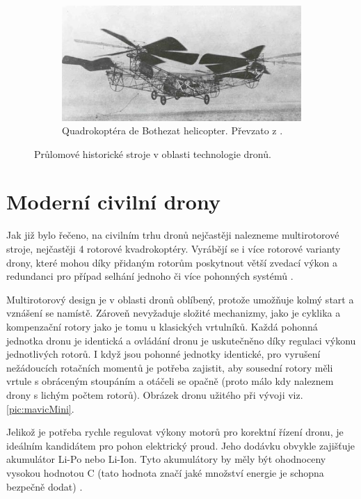 \begin{figure}[ht]
\begin{subfigure}[t]{0.26\linewidth}
        \label{pic:autoPlane}
    \end{subfigure}
        \hfill
    \begin{subfigure}[t]{0.43\linewidth}
        \centering
        \includegraphics[width=\linewidth]{obrazky-figures/drony/Bothezat_Quadrotor.jpg}
        \caption{Quadrokoptéra de Bothezat helicopter. Převzato z \cite{Quadcopter}.}
        \label{pic:quadrocopter}
    \end{subfigure}
    \caption{Průlomové historické stroje v oblasti technologie dronů.}
    \label{pic:historymisc}
\end{figure}


\section{Moderní civilní drony} \label{sec:modCivDrony}
Jak již bylo řečeno, na civilním trhu dronů nejčastěji nalezneme multirotorové stroje, nejčastěji 4 rotorové kvadrokoptéry. Vyrábějí se i více rotorové varianty drony, které mohou díky přidaným rotorům poskytnout větší zvedací výkon a redundanci pro případ selhání jednoho či více pohonných systémů \cite{Multirotor}. 

Multirotorový design je v oblasti dronů oblíbený, protože umožňuje kolmý start a vznášení se namístě. Zároveň nevyžaduje složité mechanizmy, jako je cyklika a kompenzační rotory jako je tomu u klasických vrtulníků. Každá pohonná jednotka dronu je identická a ovládání dronu je uskutečněno díky regulaci výkonu jednotlivých rotorů. I když jsou pohonné jednotky identické, pro vyrušení nežádoucích rotačních momentů je potřeba zajistit, aby sousední rotory měli vrtule s obráceným stoupáním a otáčeli se opačně (proto málo kdy naleznem drony s lichým počtem rotorů)\cite{Quadcopter}. Obrázek dronu užitého při vývoji viz. \ref{pic:mavicMini}.

Jelikož je potřeba rychle regulovat výkony motorů pro korektní řízení dronu, je ideálním kandidátem pro pohon elektrický proud. Jeho dodávku obvykle zajišťuje akumulátor Li-Po nebo Li-Ion. Tyto akumulátory by měly být ohodnoceny vysokou hodnotou C (tato hodnota značí jaké množství energie je schopna bezpečně dodat) \cite{bateriesDron}.

